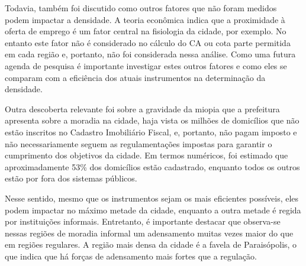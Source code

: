 Todavia, também foi discutido como outros fatores que não foram medidos podem impactar a densidade. A teoria econômica indica que a proximidade à oferta de emprego é um fator central na fisiologia da cidade, por exemplo. No entanto este fator não é considerado no cálculo do CA ou cota parte permitida em cada região e, portanto, não foi considerada nessa análise. Como uma futura agenda de pesquisa é importante investigar estes outros fatores e como eles se comparam com a eficiência dos atuais instrumentos na determinação da densidade.

Outra descoberta relevante foi sobre a gravidade da miopia que a prefeitura apresenta sobre a moradia na cidade, haja vista os milhões de domicílios que não estão inscritos no Cadastro Imobiliário Fiscal, e, portanto, não pagam imposto e não necessariamente seguem as regulamentações impostas para garantir o cumprimento dos objetivos da cidade. Em termos numéricos, foi estimado que aproximadamente 53\% dos domicílios estão cadastrado, enquanto todos os outros estão por fora dos sistemas públicos.

Nesse sentido, mesmo que os instrumentos sejam os mais eficientes possíveis, eles podem impactar no máximo metade da cidade, enquanto a outra metade é regida por instituições informais. Entretanto, é importante destacar que observa-se nessas regiões de moradia informal um adensamento muitas vezes maior do que em regiões regulares. A região mais densa da cidade é a favela de Paraisópolis, o que indica que há forças de adensamento mais fortes que a regulação.